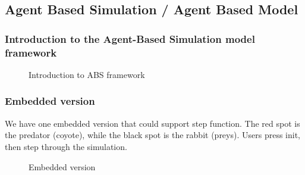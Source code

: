 \documentclass{article}
\begin{document}
\begin{normalsize}
\subsection{Agent Based Simulation / Agent Based Model}
\subsubsection{Introduction to the Agent-Based Simulation model framework}
\begin{figure}[H]
	\caption{Introduction to ABS framework}
\end{figure}
\subsubsection{Embedded version}
We have one embedded version that could support step function. The red spot is the predator (coyote), while the black spot is the rabbit (preys). Users press init, then step through the simulation.
\begin{figure}[H]
	\caption{Embedded version}
	\end{figure}

\end{normalsize}
\end{document}
